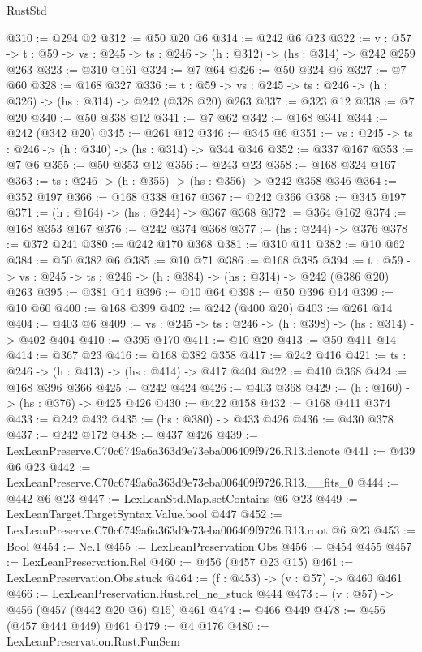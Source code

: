 \begin{lexlean}{RustStd}
\begin{coremodule}
@310 := @294 @2
@312 := @50 @20 @6
@314 := @242 @6 @23
@322 := {v : @57} ->
  {t : @59} -> {vs : @245} -> {ts : @246} -> (h : @312) -> (hs : @314) -> @242 @259 @263
@323 := @310 @161
@324 := @7 @64
@326 := @50 @324 @6
@327 := @7 @60
@328 := @168 @327
@336 := {t : @59} -> {vs : @245} -> {ts : @246} -> (h : @326) -> (hs : @314) -> @242 (@328 @20) @263
@337 := @323 @12
@338 := @7 @20
@340 := @50 @338 @12
@341 := @7 @62
@342 := @168 @341
@344 := @242 (@342 @20)
@345 := @261 @12
@346 := @345 @6
@351 := {vs : @245} -> {ts : @246} -> (h : @340) -> (hs : @314) -> @344 @346
@352 := @337 @167
@353 := @7 @6
@355 := @50 @353 @12
@356 := @243 @23
@358 := @168 @324 @167
@363 := {ts : @246} -> (h : @355) -> (hs : @356) -> @242 @358 @346
@364 := @352 @197
@366 := @168 @338 @167
@367 := @242 @366
@368 := @345 @197
@371 := (h : @164) -> (hs : @244) -> @367 @368
@372 := @364 @162
@374 := @168 @353 @167
@376 := @242 @374 @368
@377 := (hs : @244) -> @376
@378 := @372 @241
@380 := @242 @170 @368
@381 := @310 @11
@382 := @10 @62
@384 := @50 @382 @6
@385 := @10 @71
@386 := @168 @385
@394 := {t : @59} -> {vs : @245} -> {ts : @246} -> (h : @384) -> (hs : @314) -> @242 (@386 @20) @263
@395 := @381 @14
@396 := @10 @64
@398 := @50 @396 @14
@399 := @10 @60
@400 := @168 @399
@402 := @242 (@400 @20)
@403 := @261 @14
@404 := @403 @6
@409 := {vs : @245} -> {ts : @246} -> (h : @398) -> (hs : @314) -> @402 @404
@410 := @395 @170
@411 := @10 @20
@413 := @50 @411 @14
@414 := @367 @23
@416 := @168 @382 @358
@417 := @242 @416
@421 := {ts : @246} -> (h : @413) -> (hs : @414) -> @417 @404
@422 := @410 @368
@424 := @168 @396 @366
@425 := @242 @424
@426 := @403 @368
@429 := (h : @160) -> (hs : @376) -> @425 @426
@430 := @422 @158
@432 := @168 @411 @374
@433 := @242 @432
@435 := (hs : @380) -> @433 @426
@436 := @430 @378
@437 := @242 @172
@438 := @437 @426
@439 := LexLeanPreserve.C70c6749a6a363d9e73eba006409f9726.R13.denote
@441 := @439 @6 @23
@442 := LexLeanPreserve.C70c6749a6a363d9e73eba006409f9726.R13.__fits_0
@444 := @442 @6 @23
@447 := LexLeanStd.Map.setContains @6 @23
@449 := LexLeanTarget.TargetSyntax.Value.bool @447
@452 := LexLeanPreserve.C70c6749a6a363d9e73eba006409f9726.R13.root @6 @23
@453 := Bool
@454 := Ne.{1}
@455 := LexLeanPreservation.Obs
@456 := @454 @455
@457 := LexLeanPreservation.Rel
@460 := @456 (@457 @23 @15)
@461 := LexLeanPreservation.Obs.stuck
@464 := (f : @453) -> (v : @57) -> @460 @461
@466 := LexLeanPreservation.Rust.rel_ne_stuck @444
@473 := (v : @57) -> @456 (@457 (@442 @20 @6) @15) @461
@474 := @466 @449
@478 := @456 (@457 @444 @449) @461
@479 := @4 @176
@480 := LexLeanPreservation.Rust.FunSem

\end{coremodule}
\end{lexlean}
